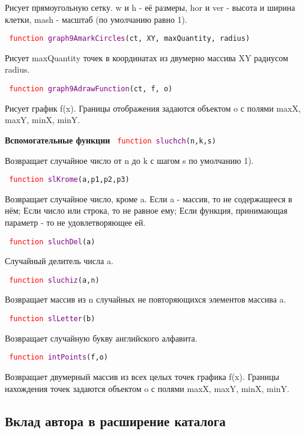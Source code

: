 Рисует прямоугольную сетку. w и h  \-- её размеры, hor и ver \-- высота и ширина клетки, mash - масштаб (по умолчанию равно 1).

\hypertarget{graph9AmarkCircles}{\texttt{
	\textcolor{Red}{function} \textcolor{Purple}{graph9AmarkCircles}(ct, XY, maxQuantity, radius)
}}

Рисует maxQuantity точек в координатах из двумерно массива XY радиусом radius.

\hypertarget{graph9AdrawFunction}{\texttt{
	\textcolor{Red}{function} \textcolor{Purple}{graph9AdrawFunction}(ct, f, o)
}}

Рисует график f(x). Границы отображения задаются объектом o с полями maxX, maxY, minX, minY.

\textbf{Вспомогательные функции}
\hypertarget{sluchch}{\texttt{
	\textcolor{Red}{function} \textcolor{Purple}{sluchch}(n,k,s)
}}

Возвращает случайное число от n до k с шагом s по умолчанию 1).

\hypertarget{slKrome}{\texttt{
	\textcolor{Red}{function} \textcolor{Purple}{slKrome}(a,p1,p2,p3)
}}

Возвращает случайное число, кроме a. Если a \-- массив, то не содержащееся в нём; Если число или строка, то не равное ему; Если функция, принимающая параметр - то не удовлетворяющее ей.

\texttt{
	\textcolor{Red}{function} \textcolor{Purple}{sluchDel}(a)
}

Случайный делитель числа a.

\texttt{
	\textcolor{Red}{function} \textcolor{Purple}{sluchiz}(a,n)
}

Возвращает массив из n случайных не повторяющихся элементов массива a.

\texttt{
	\textcolor{Red}{function} \textcolor{Purple}{slLetter}(b)
}

Возвращает случайную букву английского алфавита.

\hypertarget{intPoints}{\texttt{
	\textcolor{Red}{function} \textcolor{Purple}{intPoints}(f,o)
}}

Возвращает двумерный массив из всех целых точек графика f(x). Границы нахождения точек задаются объектом o с полями maxX, maxY, minX, minY.

\subsection{Вклад автора в расширение каталога}